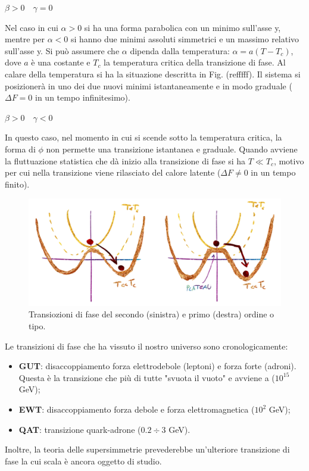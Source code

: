 \begin{example}
    $\beta > 0 \quad \gamma = 0 $
\end{example}
Nel caso in cui $\alpha >0$ si ha una forma parabolica con un minimo sull'asse y, mentre per  $\alpha <0$ si hanno due minimi assoluti simmetrici e un massimo relativo sull'asse y. Si può assumere che $\alpha$ dipenda dalla temperatura: $\alpha =a(T-T_c)$, dove $a$ è una costante e $T_c$ la temperatura critica della transizione di fase. Al calare della temperatura si ha la situazione descritta in Fig. (refffff). Il sistema si posizionerà in uno dei due nuovi minimi istantaneamente e in modo graduale ($\Delta F = 0$ in un tempo infinitesimo).

\begin{example}
    $\beta > 0 \quad \gamma < 0 $
\end{example}
In questo caso, nel momento in cui si scende sotto la temperatura critica, la forma di $\phi$ non permette una transizione istantanea e graduale. Quando avviene la fluttuazione statistica che dà inizio alla transizione di fase si ha $T \ll T_c$, motivo per cui nella transizione viene rilasciato del calore latente ($\Delta F \neq 0$ in un tempo finito).

\begin{figure}[h]
    \centering
    \includegraphics[width=.8\textwidth]{Pictures/4/transfase.png}
    \caption{Transiozioni di fase del secondo (sinistra) e primo (destra) ordine o tipo.}
    \label{fig:4}
\end{figure}


\vspace{2em}
\noindent Le transizioni di fase che ha vissuto il nostro universo sono cronologicamente:
\begin{itemize}
    \item \textbf{GUT}: disaccoppiamento forza elettrodebole (leptoni) e forza forte (adroni). Questa è la transizione che più di tutte "svuota il vuoto" e avviene a ($10^{15 }$ GeV);
    \item \textbf{EWT}: disaccoppiamento forza debole e forza elettromagnetica ($10^{2}$ GeV);
    \item \textbf{QAT}: transizione quark-adrone ($0.2 \div 3$ GeV).
\end{itemize}
Inoltre, la teoria delle supersimmetrie prevederebbe un'ulteriore transizione di fase la cui scala è ancora oggetto di studio. 

